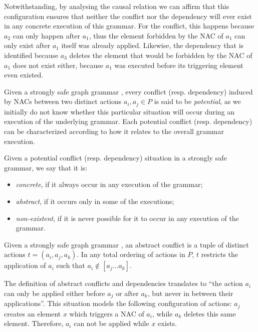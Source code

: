 \begin{example}
Notwithstanding, by analysing the causal relation we can affirm that this configuration ensures that neither the conflict nor the dependency will ever exist in any concrete execution of this grammar. For the conflict, this happens because $a_2$ can only happen after $a_1$, thus the element forbidden by the NAC of $a_1$ can only exist after $a_1$ itself was already applied. Likewise, the dependency that is identified because $a_3$ deletes the element that would be forbidden by the NAC of $a_1$
  does not exist either, because $a_1$ was executed before its triggering element even existed.
\end{example}

\begin{definition}\label{def:conflict-dependency-characterization} Given a strongly safe graph grammar \doublyTypedGraphGrammarCore{}, every conflict (resp. dependency) induced by NACs between two distinct actions $a_i, a_j \in P$ is said to be \emph{potential}, as we initially do not know whether this particular situation will occur during an execution of the underlying grammar. Each potential conflict (resp. dependency) can be characterized according to how it relates to the overall grammar execution.

    Given a potential conflict (resp. dependency) situation in a strongly safe grammar, we say that it is:
    \begin{itemize}
      \item \emph{concrete}, if it always occur in any execution of the grammar;
      \item \emph{abstract}, if it occurs only in some of the executions;
      \item \emph{non-existent}, if it is never possible for it to occur in any execution of the grammar.
    \end{itemize}
\end{definition}

\begin{definition} Given a strongly safe graph grammar \doublyTypedGraphGrammarCore{}, an abstract conflict is a tuple of distinct actions $t = (a_i,a_j,a_k)$. In any total ordering of actions in $P$, $t$ restricts the application of $a_i$ such that $a_i \not\in [a_j \ldots a_k]$.

\hfill
\end{definition}

The definition of abstract conflicts and dependencies translates to ``the action $a_i$ can only be applied either before $a_j$ or after $a_k$, but never in between their applications''. This situation models the following configuration of actions: $a_j$ creates an element $x$ which triggers a NAC of $a_i$, while $a_k$ deletes this same element. Therefore, $a_i$ can not be applied while $x$ exists.

